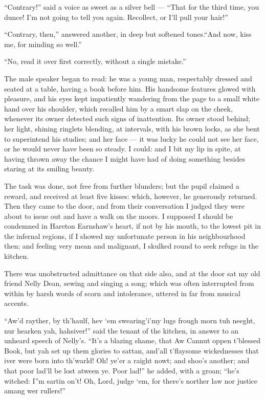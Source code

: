 \par “Contrary!” said a voice as sweet as a silver bell — “That for the third time, you dunce! I'm not going to tell you again. Recollect, or I'll pull your hair!”
\par “Contrary, then,” answered another, in deep but softened tones.“And now, kiss me, for minding so well.”
\par “No, read it over first correctly, without a single mistake.”
\par The male speaker began to read: he was a young man, respectably dressed and seated at a table, having a book before him. His handsome features glowed with pleasure, and his eyes kept impatiently wandering from the page to a small white hand over his shoulder, which recalled him by a smart slap on the cheek, whenever its owner detected such signs of inattention. Its owner stood behind; her light, shining ringlets blending, at intervals, with his brown locks, as she bent to superintend his studies; and her face — it was lucky he could not see her face, or he would never have been so steady. I could: and I bit my lip in spite, at having thrown away the chance I might have had of doing something besides staring at its smiling beauty.
\par The task was done, not free from further blunders; but the pupil claimed a reward, and received at least five kisses: which, however, he generously returned. Then they came to the door, and from their conversation I judged they were about to issue out and have a walk on the moors. I supposed I should be condemned in Hareton Earnshaw's heart, if not by his mouth, to the lowest pit in the infernal regions, if I showed my unfortunate person in his neighbourhood then; and feeling very mean and malignant, I skulked round to seek refuge in the kitchen.
\par There was unobstructed admittance on that side also, and at the door sat my old friend Nelly Dean, sewing and singing a song; which was often interrupted from within by harsh words of scorn and intolerance, uttered in far from musical accents.
\par “Aw'd rayther, by th'haulf, hev ‘em swearing'i'my lugs frough morn tuh neeght, nur hearken yah, hahsiver!” said the tenant of the kitchen, in answer to an unheard speech of Nelly's. “It's a blazing shame, that Aw Cannut oppen t'blessed Book, but yah set up them glories to sattan, and'all t'flaysome wickednesses that iver were born into th'warld! Oh! ye'er a raight nowt; and shoo's another; and that poor lad'll be lost atween ye. Poor lad!” he added, with a groan; “he's witched: I”m sartin on't! Oh, Lord, judge ‘em, for there's norther law nor justice amang wer rullers!”
